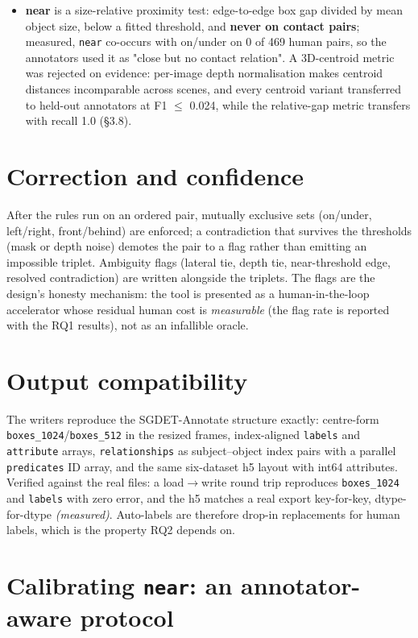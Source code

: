\begin{itemize}
\item \textbf{near} is a size-relative proximity test: edge-to-edge box gap divided by
mean object size, below a fitted threshold, and \textbf{never on contact pairs}; measured, \texttt{near} co-occurs with on/under on 0 of 469 human pairs, so the annotators used it as "close but no contact relation". A 3D-centroid metric was rejected on evidence: per-image depth normalisation makes centroid distances incomparable across scenes, and every centroid variant transferred to held-out annotators at F1 $\leq$ 0.024, while the relative-gap metric transfers with recall 1.0 (\S3.8).
\end{itemize}

\section{Correction and confidence}

After the rules run on an ordered pair, mutually exclusive sets (on/under, left/right, front/behind) are enforced; a contradiction that survives the thresholds (mask or depth noise) demotes the pair to a flag rather than emitting an impossible triplet. Ambiguity flags (lateral tie, depth tie, near-threshold edge, resolved contradiction) are written alongside the triplets. The flags are the design's honesty mechanism: the tool is presented as a human-in-the-loop accelerator whose residual human cost is \textit{measurable} (the flag rate is reported with the RQ1 results), not as an infallible oracle.

\section{Output compatibility}

The writers reproduce the SGDET-Annotate structure exactly: centre-form \texttt{boxes\_1024}/\texttt{boxes\_512} in the resized frames, index-aligned \texttt{labels} and \texttt{attribute} arrays, \texttt{relationships} as subject--object index pairs with a parallel \texttt{predicates} ID array, and the same six-dataset h5 layout with int64 attributes. Verified against the real files: a load$\rightarrow$write round trip reproduces \texttt{boxes\_1024} and \texttt{labels} with zero error, and the h5 matches a real export key-for-key, dtype-for-dtype \textit{(measured)}. Auto-labels are therefore drop-in replacements for human labels, which is the property RQ2 depends on.

\section{Calibrating \texttt{near}: an annotator-aware protocol}

